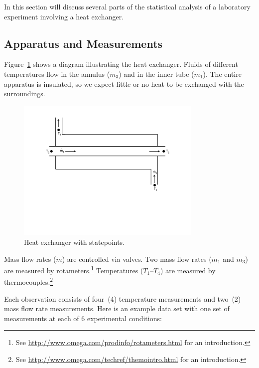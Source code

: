 \documentclass[twoside]{book}\usepackage[]{graphicx}\usepackage[]{xcolor}
\newcommand{\Partial}[2]{\frac{\partial #1}{\partial #2}}
\newcounter{example}[section]
\begin{document}
In this section will discuss several parts of the statistical
analysis of a laboratory experiment involving a heat exchanger.


\subsection{Apparatus and Measurements}

Figure~\ref{fig:HXerFigure} shows a diagram illustrating the 
heat exchanger.  Fluids of different temperatures flow in the annulus 
($\dot{m}_{3}$) and in the inner tube ($\dot{m}_{1}$).
The entire apparatus is insulated, 
so we expect little or no heat to be exchanged with the surroundings.

\begin{figure}
    \centering
    \includegraphics[width = 3.5in]{images/HXerFig.pdf}
    \caption{Heat exchanger with statepoints.}
    \label{fig:HXerFigure}
\end{figure}


Mass flow rates ($\dot{m}$) are controlled via valves.
Two mass flow rates ($\dot{m}_{1}$ and $\dot{m}_{3}$)
are measured by rotameters.\footnote{See 
\url{http://www.omega.com/prodinfo/rotameters.html}
for an introduction.}
Temperatures ($T_{1}$--$T_{4}$) are measured by thermocouples.\footnote{See 
\url{http://www.omega.com/techref/themointro.html} for an introduction.}



Each observation consists of four~(4) temperature measurements 
and two~(2) mass flow rate measurements. 
Here is an example data set with one set of measurements at each of 6
experimental conditions:
\end{document}
